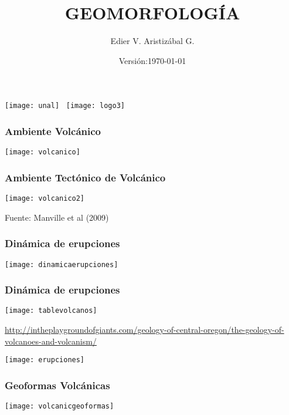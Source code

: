 \documentclass{beamer}
\title[Ambiente Volcánico]{GEOMORFOLOGÍA}
\author[Edier Aristizabal]{Edier V. Aristizábal G.}
\institute{evaristizabalg@unal.edu.co}
\date{Versión:\today}
\begin{document}
\begin{frame}
\titlepage
\centering
	\texttt{[image: unal]}\hspace*{4.75cm}~%
   	\texttt{[image: logo3]} 
\end{frame}
\begin{frame}
\frametitle{Ambiente Volcánico}
\begin{center}
\texttt{[image: volcanico]}
\end{center}
\end{frame}
\begin{frame}
\frametitle{Ambiente Tectónico de Volcánico}
\begin{center}
\texttt{[image: volcanico2]}
\end{center}
\tiny{Fuente: Manville et al (2009)}
\end{frame}
\begin{frame}
\frametitle{Dinámica de erupciones}
\begin{center}
\texttt{[image: dinamicaerupciones]}
\end{center}
\end{frame}
\begin{frame}
\frametitle{Dinámica de erupciones}
\begin{center}
\texttt{[image: tablevolcanos]}
\end{center}
\tiny{\url{http://intheplaygroundofgiants.com/geology-of-central-oregon/the-geology-of-volcanoes-and-volcanism/}}
\end{frame}
\begin{frame}
\begin{center}
\texttt{[image: erupciones]}
\end{center}
\end{frame}
\begin{frame}
\frametitle{Geoformas Volcánicas}
\begin{center}
\texttt{[image: volcanicgeoformas]}
\end{center}
\end{frame}
\end{document}
